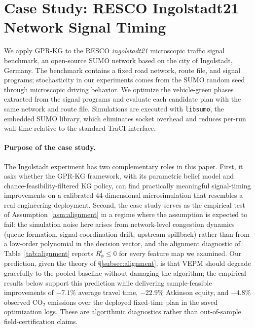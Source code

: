 \documentclass[12pt]{article}
\theoremstyle{plain}
\theoremstyle{definition}
\theoremstyle{remark}
\begin{document}
\section{Case Study: RESCO Ingolstadt21 Network Signal Timing}\label{sec:case_study}

We apply GPR-KG to the RESCO \emph{ingolstadt21} microscopic traffic
signal benchmark, an open-source SUMO network based on the city of
Ingolstadt, Germany.  The benchmark contains a fixed road network,
route file, and signal programs; stochasticity in our experiments comes
from the SUMO random seed through microscopic driving behavior.  We
optimize the vehicle-green phases extracted from the signal programs
and evaluate each candidate plan with the same network and route file.
Simulations are executed with \texttt{libsumo}, the embedded SUMO
library, which eliminates socket overhead and reduces per-run wall time
relative to the standard TraCI interface.

\paragraph{Purpose of the case study.}
The Ingolstadt experiment has two complementary roles in this paper.
First, it asks whether the GPR-KG framework, with its parametric belief
model and chance-feasibility-filtered KG policy, can find practically
meaningful signal-timing improvements on a calibrated
$44$-dimensional microsimulation that resembles a real engineering
deployment.  Second, the case study serves as the empirical test of
Assumption~\ref{asm:alignment} in a regime where the assumption is
expected to fail: the simulation noise here arises from network-level
congestion dynamics (queue formation, signal-coordination drift,
upstream spillback) rather than from a low-order polynomial in the
decision vector, and the alignment diagnostic of
Table~\ref{tab:alignment} reports $R_\phi^{i}\le 0$ for every feature
map we examined.  Our prediction, given the theory of
\S\ref{subsec:alignment}, is that VEPM should degrade gracefully to
the pooled baseline without damaging the algorithm; the empirical
results below support this prediction while delivering sample-feasible
improvements of $-7.1\%$ average travel time, $-22.9\%$ Atkinson equity,
and $-4.8\%$ observed CO$_2$ emissions over the deployed fixed-time plan
in the saved optimization logs.  These are algorithmic diagnostics
rather than out-of-sample field-certification claims.
\end{document}
